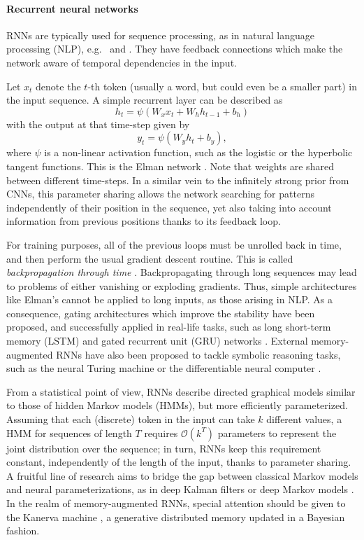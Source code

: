 \paragraph{Recurrent neural networks} RNNs are typically used for sequence processing, as in natural language processing (NLP), e.g.\ \cite{hochreiter1997long} and \cite{chung2014empirical}. They have feedback connections which make the network aware of temporal dependencies in the input.

Let $x_t$ denote the $t$-th token (usually a word, but could even be 
a smaller part) in the input sequence. A simple recurrent layer can be described as
$$
h_t = \psi(W_x x_t + W_h h_{t-1} + b_h)
$$
with the output at that time-step given by
$$
y_t = \psi(W_y h_t + b_y),
$$
where $\psi$ is a non-linear activation function, such as the logistic or the hyperbolic tangent functions. This is the Elman network \cite{cruse2006neural}. Note that weights are shared between different time-steps. In a similar vein to the infinitely strong prior from CNNs, this parameter sharing allows the network searching for patterns independently of their position in the sequence, yet also taking into account information from previous positions thanks to its feedback loop.

For training purposes, all of the previous loops must be unrolled back in time, and then perform the usual gradient descent routine.
This is called \emph{backpropagation through time} \cite{58337}.
Backpropagating through long sequences may lead to problems
of either vanishing or exploding gradients. Thus, 
simple architectures like Elman's cannot be applied to long inputs, as those arising in NLP. 
As a consequence, gating architectures which improve the stability have been proposed, and successfully applied in real-life tasks,
such as long 
short-term memory (LSTM) \cite{hochreiter1997long} and gated recurrent unit (GRU) networks \cite{cho2014learning}. 
External memory-augmented RNNs have also been proposed to tackle symbolic reasoning tasks, such as the neural Turing machine \cite{graves2014neural} or the differentiable neural computer \cite{graves2016hybrid}.

From a statistical point of view, RNNs describe directed graphical models similar to those of hidden Markov models (HMMs), but more efficiently parameterized. Assuming that each (discrete) token in the input can take $k$ different values, a HMM for sequences of length $T$ requires $\mathcal{O}(k^T)$ parameters to represent
the joint distribution over the sequence; in turn, RNNs keep this requirement constant, independently of the length of the input, thanks to parameter sharing. A fruitful line of research aims to bridge the gap between classical Markov models and neural parameterizations, as in deep Kalman filters \cite{krishnan2015deep} or deep Markov models \cite{krishnan2016structured}. In the realm of memory-augmented RNNs, special attention should be given to the Kanerva machine \cite{wu2018kanerva}, a generative distributed memory updated in a Bayesian fashion.



